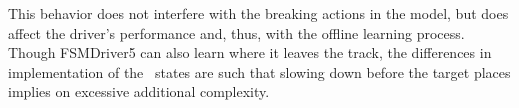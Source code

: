 This behavior does not interfere with the breaking actions in the model, but does affect the driver's performance and, thus, with the offline learning process. Though FSMDriver5 can also learn where it leaves the track, the differences in implementation of the \racing~states are such that slowing down before the target places implies on excessive additional complexity.